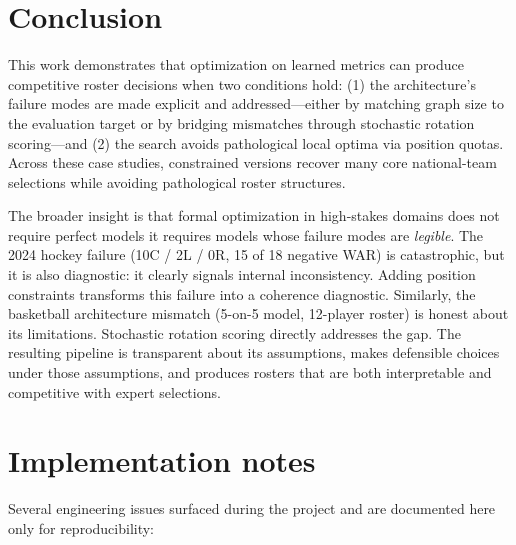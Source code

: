 \documentclass[11pt,letterpaper]{article}
\begin{document}
\section{Conclusion}

This work demonstrates that optimization on learned metrics can produce
competitive roster decisions when two conditions hold: (1) the
architecture's failure modes are made explicit and addressed---either
by matching graph size to the evaluation target or by bridging
mismatches through stochastic rotation scoring---and (2) the search
avoids pathological local optima via position quotas. Across these case studies, constrained versions
recover many core national-team selections while avoiding pathological
roster structures.

The broader insight is that formal optimization in high-stakes domains
does not require perfect models it requires models whose failure modes
are \emph{legible}. The 2024 hockey failure (10C / 2L / 0R, 15 of 18
negative WAR) is catastrophic, but it is also diagnostic: it clearly
signals internal inconsistency. Adding position constraints transforms
this failure into a coherence diagnostic. Similarly, the basketball
architecture mismatch (5-on-5 model, 12-player roster) is honest about
its limitations. Stochastic rotation scoring directly addresses the
gap. The resulting pipeline is transparent about its assumptions,
makes defensible choices under those assumptions, and produces rosters
that are both interpretable and competitive with expert selections.

\appendix
\section{Implementation notes}

Several engineering issues surfaced during the project and are
documented here only for reproducibility:
\end{document}
